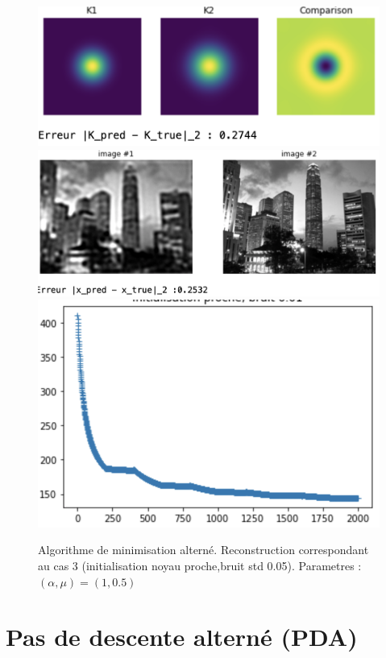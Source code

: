 \documentclass[a4paper]{article}
\begin{document}
\begin{figure}[h]
\includegraphics[scale=0.8]{figures/altrn-cas3-kernel}
\includegraphics[scale=0.6]{figures/altrn-cas3-image}
\includegraphics[scale=0.6]{figures/altrn-cas3-energy}
\caption{Algorithme de minimisation alterné. Reconstruction correspondant au cas 3  (initialisation noyau proche,bruit std 0.05). Parametres : $(\alpha,\mu) =(1,0.5)$}
\end{figure}

\section{Pas de descente alterné (PDA)}
%
\end{document}
